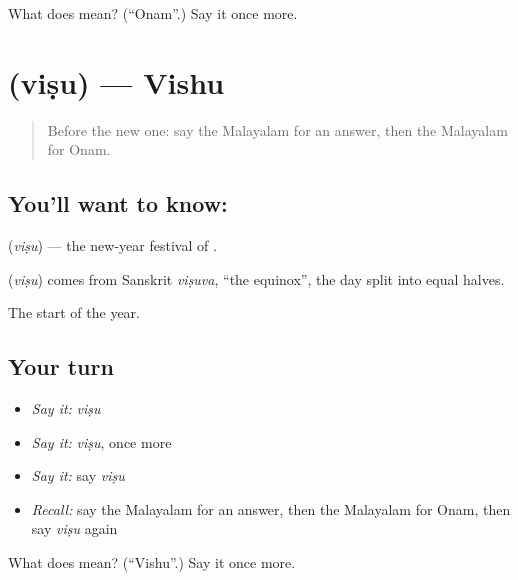 \begin{tcolorbox}[breakable,colback=teal!4,colframe=teal!35!black,title={Before you move on}]
What does  mean? (\textquotedblleft{}Onam\textquotedblright{}.) Say it once more.
\end{tcolorbox}
\section[\texorpdfstring{\ml{വിഷു} (viṣu)}{വിഷു (viṣu)}]{ (viṣu) — Vishu}

\label{lesson:ML-C141-vishu}



\begin{quote}
Before the new one: say the Malayalam for an answer, then the Malayalam for Onam.
\end{quote}

\subsection*{You'll want to know: }
\textbf{} (\emph{viṣu}) — the new-year festival of \textbf{}.

\begin{cousinweb}
\textbf{} (\emph{viṣu}) comes from Sanskrit \emph{viṣuva}, \textquotedblleft{}the equinox\textquotedblright{}, the day split into equal halves.
\end{cousinweb}

\begin{grammarlens}[title={What you've built}]
The start of the year.
\end{grammarlens}

\subsection*{Your turn}
\begin{itemize}
\raggedright
  \item \emph{Say it:} \emph{viṣu}
  \item \emph{Say it:} \emph{viṣu}, once more
  \item \emph{Say it:} say \emph{viṣu}
  \item \emph{Recall:} say the Malayalam for an answer, then the Malayalam for Onam, then say \emph{viṣu} again
\end{itemize}

\begin{tcolorbox}[breakable,colback=teal!4,colframe=teal!35!black,title={Before you move on}]
What does  mean? (\textquotedblleft{}Vishu\textquotedblright{}.) Say it once more.
\end{tcolorbox}
